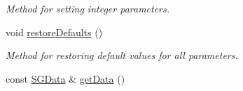 \begin{DoxyCompactItemize}
\begin{DoxyCompactList}\small\item\em Method for setting integer parameters. \end{DoxyCompactList}\item 
\hypertarget{class_s_g_solver_a4c4e7b2829453e53591d1bcf6e493431}{void \hyperlink{class_s_g_solver_a4c4e7b2829453e53591d1bcf6e493431}{restore\+Defaults} ()}\label{class_s_g_solver_a4c4e7b2829453e53591d1bcf6e493431}

\begin{DoxyCompactList}\small\item\em Method for restoring default values for all parameters. \end{DoxyCompactList}\item 
const \hyperlink{class_s_g_data}{S\+G\+Data} \& \hyperlink{class_s_g_solver_a375acb6cfcad64671b633c5bdb780659}{get\+Data} ()
\end{DoxyCompactItemize}
